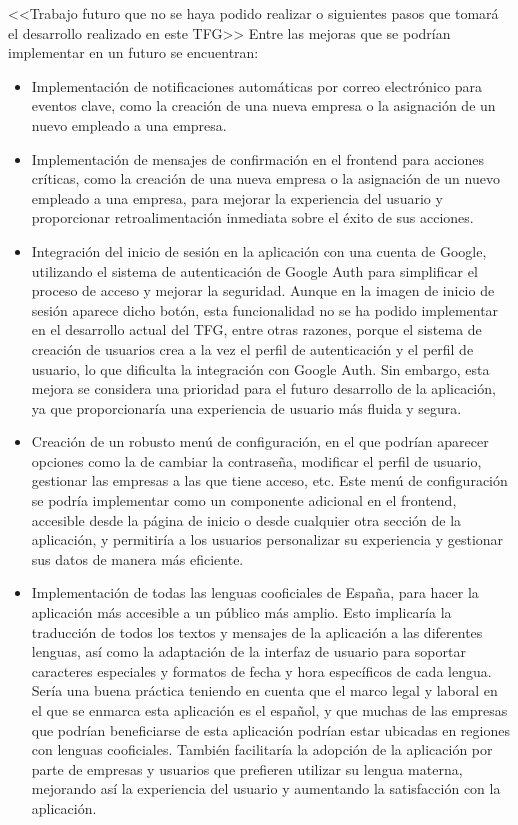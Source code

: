 <<Trabajo futuro que no se haya podido realizar o siguientes pasos que tomará el desarrollo realizado en este TFG>>
Entre las mejoras que se podrían implementar en un futuro se encuentran:
\begin{itemize}
    \item Implementación de notificaciones automáticas por correo electrónico para eventos clave, como la creación de una nueva empresa o la asignación de un nuevo empleado a una empresa.
    \item Implementación de mensajes de confirmación en el frontend para acciones críticas, como la creación de una nueva empresa o la asignación de un nuevo empleado a una empresa, para mejorar la experiencia del usuario y proporcionar retroalimentación inmediata sobre el éxito de sus acciones.
    \item Integración del inicio de sesión en la aplicación con una cuenta de Google, utilizando el sistema de autenticación de Google Auth para simplificar el proceso de acceso y mejorar la seguridad. Aunque en la imagen de inicio de sesión aparece dicho botón, esta funcionalidad no se ha podido implementar en el desarrollo actual del TFG, entre otras razones, porque el sistema de creación de usuarios crea a la vez el perfil de autenticación y el perfil de usuario, lo que dificulta la integración con Google Auth. Sin embargo, esta mejora se considera una prioridad para el futuro desarrollo de la aplicación, ya que proporcionaría una experiencia de usuario más fluida y segura.
    \item Creación de un robusto menú de configuración, en el que podrían aparecer opciones como la de cambiar la contraseña, modificar el perfil de usuario, gestionar las empresas a las que tiene acceso, etc. Este menú de configuración se podría implementar como un componente adicional en el frontend, accesible desde la página de inicio o desde cualquier otra sección de la aplicación, y permitiría a los usuarios personalizar su experiencia y gestionar sus datos de manera más eficiente.
    \item Implementación de todas las lenguas cooficiales de España, para hacer la aplicación más accesible a un público más amplio. Esto implicaría la traducción de todos los textos y mensajes de la aplicación a las diferentes lenguas, así como la adaptación de la interfaz de usuario para soportar caracteres especiales y formatos de fecha y hora específicos de cada lengua. Sería una buena práctica teniendo en cuenta que el marco legal y laboral en el que se enmarca esta aplicación es el español, y que muchas de las empresas que podrían beneficiarse de esta aplicación podrían estar ubicadas en regiones con lenguas cooficiales. También facilitaría la adopción de la aplicación por parte de empresas y usuarios que prefieren utilizar su lengua materna, mejorando así la experiencia del usuario y aumentando la satisfacción con la aplicación.
\end{itemize}

